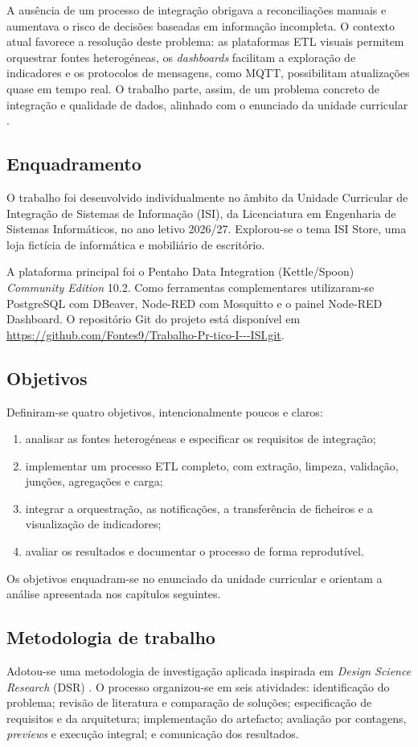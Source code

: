 \documentclass[11pt,a4paper]{article}
\begin{document}
A ausência de um processo de integração obrigava a reconciliações manuais e aumentava o risco de decisões baseadas em informação incompleta. O contexto atual favorece a resolução deste problema: as plataformas ETL visuais permitem orquestrar fontes heterogéneas, os \textit{dashboards} facilitam a exploração de indicadores e os protocolos de mensagens, como MQTT, possibilitam atualizações quase em tempo real. O trabalho parte, assim, de um problema concreto de integração e qualidade de dados, alinhado com o enunciado da unidade curricular \cite{ferreira2026enunciado}.

\subsection{Enquadramento}
O trabalho foi desenvolvido individualmente no âmbito da Unidade Curricular de Integração de Sistemas de Informação (ISI), da Licenciatura em Engenharia de Sistemas Informáticos, no ano letivo 2026/27. Explorou-se o tema ISI Store, uma loja fictícia de informática e mobiliário de escritório.

A plataforma principal foi o Pentaho Data Integration (Kettle/Spoon) \textit{Community Edition} 10.2. Como ferramentas complementares utilizaram-se PostgreSQL com DBeaver, Node-RED com Mosquitto e o painel Node-RED Dashboard. O repositório Git do projeto está disponível em \url{https://github.com/Fontes9/Trabalho-Pr-tico-I---ISI.git}.

\subsection{Objetivos}
Definiram-se quatro objetivos, intencionalmente poucos e claros:
\begin{enumerate}
\item analisar as fontes heterogéneas e especificar os requisitos de integração;
\item implementar um processo ETL completo, com extração, limpeza, validação, junções, agregações e carga;
\item integrar a orquestração, as notificações, a transferência de ficheiros e a visualização de indicadores;
\item avaliar os resultados e documentar o processo de forma reprodutível.
\end{enumerate}
Os objetivos enquadram-se no enunciado da unidade curricular \cite{ferreira2026enunciado} e orientam a análise apresentada nos capítulos seguintes.

\subsection{Metodologia de trabalho}
Adotou-se uma metodologia de investigação aplicada inspirada em \textit{Design Science Research} (DSR) \cite{hevner2004design}. O processo organizou-se em seis atividades: identificação do problema; revisão de literatura e comparação de soluções; especificação de requisitos e da arquitetura; implementação do artefacto; avaliação por contagens, \textit{previews} e execução integral; e comunicação dos resultados.
\end{document}
